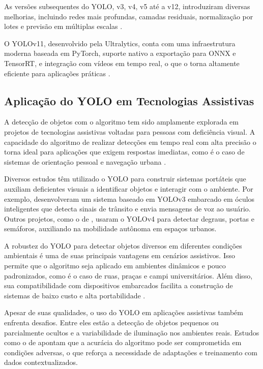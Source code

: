 As versões subsequentes do YOLO, v3, v4, v5 até a v12, introduziram diversas melhorias, incluindo redes mais profundas, camadas residuais, normalização por lotes e previsão em múltiplas escalas \cite{bochkovskiy2020}.

O YOLOv11, desenvolvido pela Ultralytics, conta com uma infraestrutura moderna baseada em PyTorch, suporte nativo a exportação para ONNX e TensorRT, e integração com vídeos em tempo real, o que o torna altamente eficiente para aplicações práticas \cite{Ultralytics2024}.

\subsection{\textbf{Aplicação do YOLO em Tecnologias Assistivas}}

A detecção de objetos com o algoritmo tem sido amplamente explorada em projetos de tecnologias assistivas voltadas para pessoas com deficiência visual. A capacidade do algoritmo de realizar detecções em tempo real com alta precisão o torna ideal para aplicações que exigem respostas imediatas, como é o caso de sistemas de orientação pessoal e navegação urbana \cite{redmon2016}.

Diversos estudos têm utilizado o YOLO para construir sistemas portáteis que auxiliam deficientes visuais a identificar objetos e interagir com o ambiente. Por exemplo,  desenvolveram um sistema baseado em YOLOv3 embarcado em óculos inteligentes que detecta sinais de trânsito e envia mensagens de voz ao usuário. Outros projetos, como o de , usaram o YOLOv4 para detectar degraus, portas e semáforos, auxiliando na mobilidade autônoma em espaços urbanos.

A robustez do YOLO para detectar objetos diversos em diferentes condições ambientais é uma de suas principais vantagens em cenários assistivos. Isso permite que o algoritmo seja aplicado em ambientes dinâmicos e pouco padronizados, como é o caso de ruas, praças e campi universitários. Além disso, sua compatibilidade com dispositivos embarcados facilita a construção de sistemas de baixo custo e alta portabilidade \cite{bochkovskiy2020}.

Apesar de suas qualidades, o uso do YOLO em aplicações assistivas também enfrenta desafios. Entre eles estão a detecção de objetos pequenos ou parcialmente ocultos e a variabilidade de iluminação nos ambientes reais. Estudos como o de  apontam que a acurácia do algoritmo pode ser comprometida em condições adversas, o que reforça a necessidade de adaptações e treinamento com dados contextualizados.

